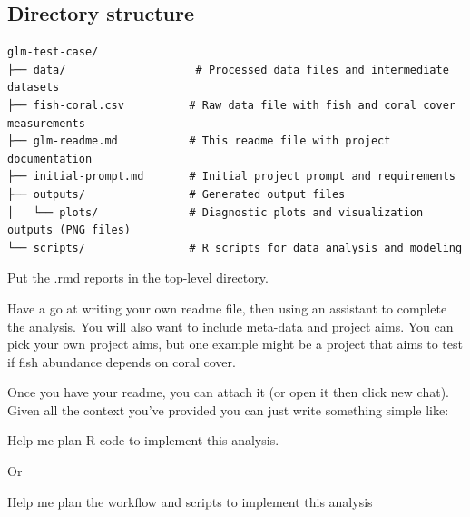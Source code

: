 \documentclass[
  letterpaper,
  DIV=11,
  numbers=noendperiod]{scrreprt}
\begin{document}
\begin{tcolorbox}
\subsection{Directory structure}\label{directory-structure-1}

\begin{verbatim}
glm-test-case/
├── data/                    # Processed data files and intermediate datasets
├── fish-coral.csv          # Raw data file with fish and coral cover measurements
├── glm-readme.md           # This readme file with project documentation
├── initial-prompt.md       # Initial project prompt and requirements
├── outputs/                # Generated output files
│   └── plots/              # Diagnostic plots and visualization outputs (PNG files)
└── scripts/                # R scripts for data analysis and modeling
\end{verbatim}

Put the .rmd reports in the top-level directory.

\end{tcolorbox}

Have a go at writing your own readme file, then using an assistant to
complete the analysis. You will also want to include
\href{https://raw.githubusercontent.com/cbrown5/example-ecological-data/refs/heads/main/readme.md}{meta-data}
and project aims. You can pick your own project aims, but one example
might be a project that aims to test if fish abundance depends on coral
cover.

Once you have your readme, you can attach it (or open it then click new
chat). Given all the context you've provided you can just write
something simple like:

\begin{tcolorbox}[enhanced jigsaw, coltitle=black, breakable, toptitle=1mm, titlerule=0mm, bottomtitle=1mm, colframe=quarto-callout-note-color-frame, left=2mm, leftrule=.75mm, title=\textcolor{quarto-callout-note-color}{\faInfo}\hspace{0.5em}{Note}, opacityback=0, colback=white, opacitybacktitle=0.6, bottomrule=.15mm, arc=.35mm, rightrule=.15mm, toprule=.15mm, colbacktitle=quarto-callout-note-color!10!white]

Help me plan R code to implement this analysis.

\end{tcolorbox}

Or

\begin{tcolorbox}[enhanced jigsaw, coltitle=black, breakable, toptitle=1mm, titlerule=0mm, bottomtitle=1mm, colframe=quarto-callout-note-color-frame, left=2mm, leftrule=.75mm, title=\textcolor{quarto-callout-note-color}{\faInfo}\hspace{0.5em}{Note}, opacityback=0, colback=white, opacitybacktitle=0.6, bottomrule=.15mm, arc=.35mm, rightrule=.15mm, toprule=.15mm, colbacktitle=quarto-callout-note-color!10!white]

Help me plan the workflow and scripts to implement this analysis

\end{tcolorbox}
\end{document}
